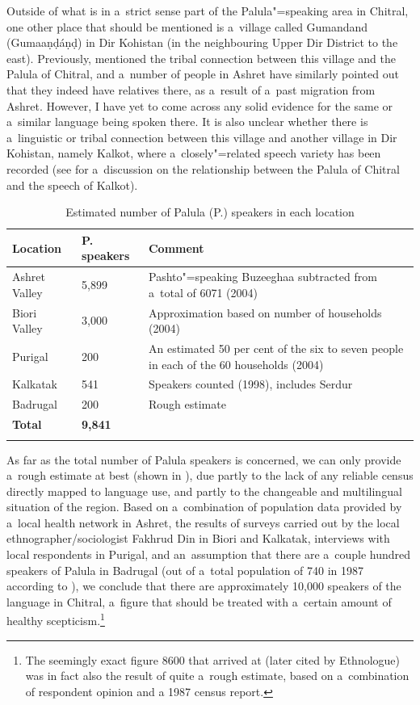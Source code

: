 Outside of what is in a~strict sense part of the Palula"=speaking area in Chitral, one other place
that should be mentioned is a~village called Gumandand (Gumaaṇḍáṇḍ) in Dir Kohistan (in the
neighbouring Upper Dir District to the east). Previously, \citet[9]{morgenstierne1941} mentioned the
tribal connection between this village and the Palula of Chitral, and a~number of people in Ashret
have similarly pointed out that they indeed have relatives there, as a~result of a~past migration
from Ashret. However, I have yet to come across any solid evidence for the same or a~similar
language being spoken there. It is also unclear whether there is a~linguistic or tribal connection
between this village and another village in Dir Kohistan, namely Kalkot, where a~closely"=related
speech variety has been recorded (see  for a~discussion on the
relationship between the Palula of Chitral and the speech of Kalkot).


\begin{table}
\caption{Estimated number of Palula (P.) speakers in each location}
\begin{tabularx}{\textwidth}{ l l Q }
\lsptoprule
Location &
 P. speakers &
Comment\\\hline
Ashret Valley &
5,899 &
Pashto"=speaking Buzeeghaa subtracted from a~total of 6071 (2004)\\
Biori Valley &
3,000 &
Approximation based on number of households (2004)\\
Purigal &
\phantom{9}200 &
An estimated 50 per cent of the six to seven people in each of the 60 households (2004)\\
Kalkatak &
\phantom{9}541 &
Speakers counted (1998), includes Serdur\\
Badrugal &
\phantom{9}200 &
Rough estimate\\
\textbf{Total} &
\textbf{9,841} &
\\\lspbottomrule
\end{tabularx}
\label{tab:1-1}
\end{table}


As far as the total number of Palula speakers is concerned, we can only provide a~rough estimate at
best (shown in ), due partly to the lack of any reliable census directly mapped
to language use, and partly to the changeable and multilingual situation of the region. Based on
a~combination of population data provided by a~local health network in Ashret, the results of
surveys carried out by the local ethnographer/sociologist Fakhrud Din in Biori and Kalkatak,
interviews with local respondents in Purigal, and an~assumption that there are a~couple hundred
speakers of Palula in Badrugal (out of a~total population of 740 in 1987 according to
\citealt[143]{decker1992a}), we conclude that there are approximately 10,000 speakers of the
language in Chitral, a~figure that should be treated with a~certain amount of healthy
scepticism.\footnote{The seemingly exact figure 8600 that \citep[74--76]{decker1992a} arrived at
  (later cited by Ethnologue) was in fact also the result of quite a~rough estimate, based on
  a~combination of respondent opinion and a 1987 census report.}


